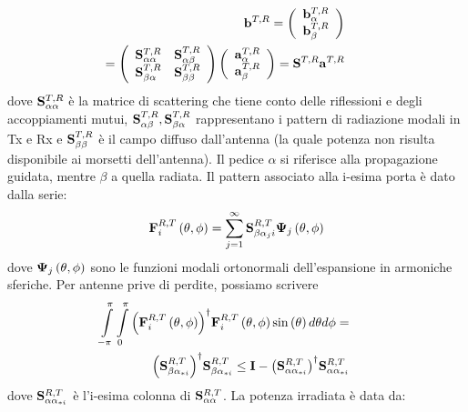 \documentclass[technote]{IEEEtran}
\begin{document}
\begin{eqnarray}
& & \hspace{-1.5cm} {{\bf{b}}^{T,R}} = \left( {\begin{array}{*{20}{c}} {{\bf{b}}_\alpha ^{T,R}}\\ {{\bf{b}}_\beta ^{T,R}} \end{array}} \right) \nonumber \\
& & \hspace{-1cm} = \left( {\begin{array}{*{20}{c}}
{{\bf{S}}_{\alpha \alpha }^{T,R}}&{{\bf{S}}_{\alpha \beta }^{T,R}}\\
{{\bf{S}}_{\beta \alpha }^{T,R}}&{{\bf{S}}_{\beta \beta }^{T,R}}
\end{array}} \right)\left( {\begin{array}{*{20}{c}}
{{\bf{a}}_\alpha ^{T,R}}\\
{{\bf{a}}_\beta ^{T,R}}
\end{array}} \right) = {{\bf{S}}^{T,R}}{{\bf{a}}^{T,R}} \nonumber
\end{eqnarray} dove ${\bf{S}}_{\alpha \alpha }^{T,R}$ è la matrice di scattering che tiene conto delle riflessioni e degli accoppiamenti mutui, ${\bf{S}}_{\alpha \beta }^{T,R},{\bf{S}}_{\beta \alpha }^{T,R}$ rappresentano i pattern di radiazione modali in Tx e Rx e ${\bf{S}}_{\beta \beta }^{T,R}$ è il campo diffuso dall'antenna (la quale potenza non risulta disponibile ai morsetti dell'antenna). Il pedice $\alpha$ si riferisce alla propagazione guidata, mentre $\beta$ a quella radiata. Il pattern associato alla i-esima porta è dato dalla serie:
\[{\bf{F}}_i^{R,T}\left( {\theta ,\phi } \right) = \sum\limits_{j = 1}^\infty  {{\bf{S}}_{{\beta}{\alpha_ji}}^{R,T}{{\bf{\Psi }}_j}\left( {\theta ,\phi } \right)} \]
dove ${{\bf{\Psi }}_j}\left( {\theta ,\phi } \right)$ sono le funzioni modali ortonormali dell'espansione in armoniche sferiche. Per antenne prive di perdite, possiamo scrivere \cite{Was2005}
\begin{eqnarray}
\label{eq:patternOrtogonalization}
& & \hspace{-1cm} \int\limits_{ - \pi }^\pi  {\int\limits_0^\pi  {{{\left( {{\bf{F}}_i^{R,T}\left( {\theta ,\phi } \right)} \right)}^\dagger}{\bf{F}}_i^{R,T}\left( {\theta ,\phi } \right)} } \sin \left( \theta  \right)d\theta d\phi = \nonumber \\ 
& & {\left( {{\bf{S}}_{\beta {\alpha _{*i}}}^{R,T}} \right)^\dagger}{\bf{S}}_{\beta {\alpha _{*i}}}^{R,T} \le {\bf{I}} - {\left( {{\bf{S}}_{\alpha {\alpha _{*i}}}^{R,T}} \right)^\dagger}{\bf{S}}_{\alpha {\alpha _{*i}}}^{R,T}
\end{eqnarray} dove ${\bf{S}}_{\alpha {\alpha _{*i}}}^{R,T}$ è l'i-esima colonna di ${\bf{S}}_{\alpha \alpha }^{R,T}$. La potenza irradiata è data da:
\end{document}
